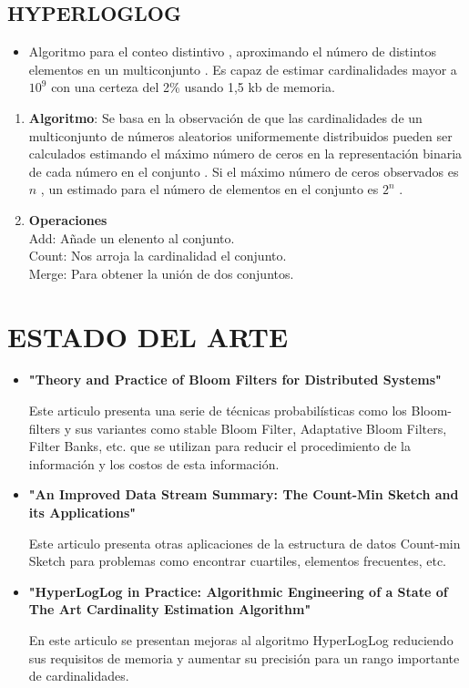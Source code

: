 \documentclass[journal]{IEEEtran}
\begin{document}
\begin{itemize}
\subsection{HYPERLOGLOG}
\begin{itemize}
    \item Algoritmo para el conteo distintivo , aproximando el n\'umero de distintos elementos en un multiconjunto . Es capaz de estimar cardinalidades mayor a $10^9$ con una certeza del 2\% usando 1,5 kb de memoria.
\end{itemize}
\begin{enumerate}
    \item {\bf Algoritmo}: Se basa en la observación de que las cardinalidades de un multiconjunto de n\'umeros aleatorios uniformemente distribuidos pueden ser calculados estimando el m\'aximo n\'umero de ceros en la representación binaria de cada n\'umero en el conjunto . Si el m\'aximo n\'umero de ceros observados es $n$ , un estimado para el n\'umero de elementos en el conjunto es $2^n$ .
    \item {\bf Operaciones} \\
    Add: Añade un elenento al conjunto.\\
    Count: Nos arroja la cardinalidad el conjunto.\\
     Merge: Para obtener la unión de dos conjuntos.
\end{enumerate}
\end{itemize}

\section{ESTADO DEL ARTE}

\begin{itemize}

\item \textbf{"Theory and Practice of Bloom Filters for Distributed Systems"}

Este articulo presenta una serie de t\'ecnicas probabil\'isticas como los Bloom-filters y sus variantes como stable Bloom Filter, Adaptative Bloom Filters, Filter Banks, etc. que se utilizan para reducir el procedimiento de la informaci\'on y los costos de esta informaci\'on.\\

\item \textbf{"An Improved Data Stream Summary: The Count-Min Sketch and its Applications"}

Este articulo presenta otras aplicaciones de la estructura de datos Count-min Sketch para problemas como encontrar cuartiles, elementos frecuentes, etc.\\

\item \textbf{"HyperLogLog in Practice: Algorithmic Engineering of a State of The Art Cardinality Estimation Algorithm"}

En este articulo se presentan mejoras al algoritmo HyperLogLog reduciendo sus requisitos de memoria y aumentar su precisi\'on para un rango importante de cardinalidades.\\

\end{itemize}
\end{document}
